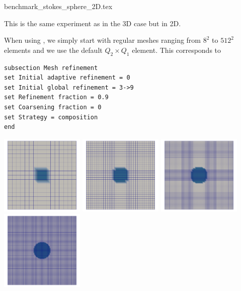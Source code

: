 \begin{flushright} {\tiny {\color{gray} benchmark\_stokes\_sphere\_2D.tex}} \end{flushright}

This is the same experiment as in the 3D case but in 2D. 

When using \aspect, we simply start with regular meshes ranging from $8^2$ to $512^2$ elements 
and we use the default $Q_2\times Q_1$ element.  
This corresponds to 
\begin{verbatim}
subsection Mesh refinement
set Initial adaptive refinement = 0 
set Initial global refinement = 3->9 
set Refinement fraction = 0.9 
set Coarsening fraction = 0 
set Strategy = composition
end
\end{verbatim}

\begin{center}
\includegraphics[width=4cm]{images/stokes_sphere2D/aspect_FS_gr/C1_gr3}
\includegraphics[width=4cm]{images/stokes_sphere2D/aspect_FS_gr/C1_gr4}
\includegraphics[width=4cm]{images/stokes_sphere2D/aspect_FS_gr/C1_gr5}
\includegraphics[width=4cm]{images/stokes_sphere2D/aspect_FS_gr/C1_gr6}
\end{center}


